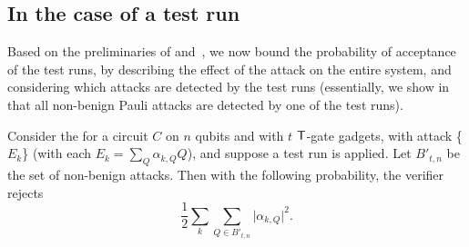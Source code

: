 \documentclass{toc}
\newcommand{\tgate}{{\sf T}}
\providecommand{\abs}[1]{\lvert#1\rvert}
\begin{document}
\subsection{In the case of a test run}
\label{sec:soundness-testrun}
Based on the preliminaries of  and~, we now bound the probability of acceptance of the test runs, by describing the effect of the attack on the entire system, and considering which attacks are detected by the test runs (essentially, we show in  that all non-benign Pauli attacks are detected by  one of the test runs).

\begin{lemma}
\label{lem:test-run-acceptance}
Consider the  for a circuit $C$ on $n$ qubits and with $t$ $\tgate$-gate gadgets, with attack  \{$E_k$\} (with each $E_k = \sum_{Q} \alpha_{k,Q} Q$), and suppose a test run is applied.
  Let $B'_{t,n}$ be the set of non-benign attacks. Then with the following probability, the verifier rejects%
\begin{equation}
\label{eqn:acceptance-test-benign}
\frac{1}{2}\sum_k\sum_{Q \in B'_{t,n}} \abs{\alpha_{k,Q}}^2.
\end{equation}
\end{lemma}
\end{document}
